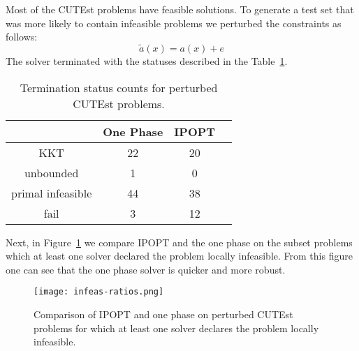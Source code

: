 \documentclass{article}
\begin{document}
Most of the CUTEst problems have feasible solutions. To generate a test set that was more likely to contain infeasible problems we perturbed the constraints as follows:
$$
\tilde{a}(x) = a(x) + e
$$
The solver terminated with the statuses described in the Table~\ref{tbl:termination-status-counts-peturbed}.
\begin{table}[H]
\caption{Termination status counts for perturbed CUTEst problems.}\label{tbl:termination-status-counts-peturbed}
\begin{tabular}{ c c c r }
 &  One Phase &  IPOPT &  \\
  \hline
KKT & 22 & 20 \\
unbounded & 1 & 0  \\
primal infeasible & 44 &  38 \\
fail & 3 & 12 \\
\end{tabular}
\end{table}

Next, in Figure~\ref{fig:comparison-IPOPT-on-perturbed-CUTEst} we compare IPOPT and the one phase on the subset problems which at least one solver declared the problem locally infeasible. From this figure one can see that the one phase solver is quicker and more robust.

\begin{figure}[H]
\texttt{[image: infeas-ratios.png]}
\caption{Comparison of IPOPT and one phase on perturbed CUTEst problems for which at least one solver declares the problem locally infeasible.}\label{fig:comparison-IPOPT-on-perturbed-CUTEst}
\end{figure}

%
%
%
%
\end{document}
